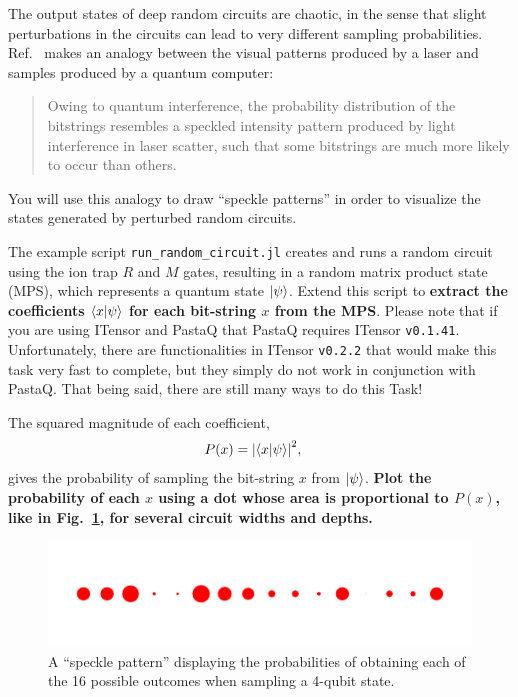 \documentclass[12pt]{article}
\begin{document}
The output states of deep random circuits are chaotic, in the sense that slight perturbations in the circuits can lead to very different sampling probabilities.
Ref.~ makes an analogy between the visual patterns produced by a laser and samples produced by a quantum computer:
\begin{quote}
Owing to quantum interference, the probability distribution of the bitstrings resembles a speckled intensity pattern produced by light interference in laser scatter, such that some bitstrings are much more likely to occur than others.
\end{quote}
You will use this analogy to draw ``speckle patterns'' in order to visualize the states generated by perturbed random circuits.

The example script \texttt{run\_random\_circuit.jl} creates and runs a random circuit using the ion trap $R$ and $M$ gates, resulting in a random matrix product state (MPS), which represents a quantum state $\ket{\psi}$.
Extend this script to \textbf{extract the coefficients $\ip{x}{\psi}$ for each bit-string $x$ from the MPS}.
Please note that if you are using ITensor and PastaQ that PastaQ requires ITensor \texttt{v0.1.41}.
Unfortunately, there are functionalities in ITensor \texttt{v0.2.2} that would make this task very fast to complete, but they simply do not work in conjunction with PastaQ.
That being said, there are still many ways to do this Task!


The squared magnitude of each coefficient,
\begin{align}
	P(x)
	&= \abs{\ip{x}{\psi}}^2,
\end{align}
gives the probability of sampling the bit-string $x$ from $\ket{\psi}$.
\textbf{Plot the probability of each $x$ using a dot whose area is proportional to $P(x)$, like in Fig.~\ref{fig:speckle}, for several circuit widths and depths.}

\begin{figure}
	\centering
	\includegraphics{images/speckle_N=004,depth=032}
	\caption{
		A ``speckle pattern'' displaying the probabilities of obtaining each of the 16 possible outcomes when sampling a 4-qubit state.
	}
	\label{fig:speckle}
\end{figure}
\end{document}
